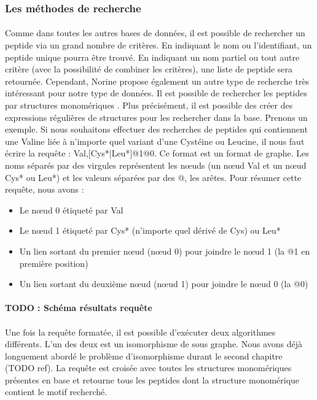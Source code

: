 \documentclass[12pt,french,twoside]{report}
\begin{document}
\subsubsection{Les méthodes de recherche}

\paragraph{}Comme dans toutes les autres bases de données, il est possible de rechercher un peptide via un grand nombre de critères.
En indiquant le nom ou l'identifiant, un peptide unique pourra être trouvé.
En indiquant un nom partiel ou tout autre critère (avec la possibilité de combiner les critères), une liste de peptide sera retournée.
Cependant, Norine propose également un autre type de recherche très intéressant pour notre type de données.
Il est possible de rechercher les peptides par structures monomériques \cite{caboche_structural_2009}.
Plus précisément, il est possible des créer des expressions régulières de structures pour les rechercher dans la base.
Prenons un exemple.
Si nous souhaitons effectuer des recherches de peptides qui contiennent une Valine liée à n'importe quel variant d'une Cystéine ou Leucine, il nous faut écrire la requête : Val,[Cys*|Leu*]@1@0.
Ce format est un format de graphe.
Les noms séparés par des virgules représentent les n\oe{}uds (un n\oe{}ud Val et un n\oe{}ud Cys* ou Leu*) et les valeurs séparées par des @, les arêtes.
Pour résumer cette requête, nous avons :
\begin{itemize}
 \item Le n\oe{}ud 0 étiqueté par Val
 \item Le n\oe{}ud 1 étiqueté par Cys* (n'importe quel dérivé de Cys) ou Leu*
 \item Un lien sortant du premier n\oe{}ud (n\oe{}ud 0) pour joindre le n\oe{}ud 1 (la @1 en première position)
 \item Un lien sortant du deuxième n\oe{}ud (n\oe{}ud 1) pour joindre le n\oe{}ud 0 (la @0)
\end{itemize}

\paragraph{TODO : Schéma résultats requête}

\paragraph{}Une fois la requête formatée, il est possible d'exécuter deux algorithmes différents.
L'un des deux est un isomorphisme de sous graphe.
Nous avons déjà longuement abordé le problème d'isomorphisme durant le second chapitre (TODO ref).
La requête est croisée avec toutes les structures monomériques présentes en base et retourne tous les peptides dont la structure monomérique contient le motif recherché.
\end{document}
